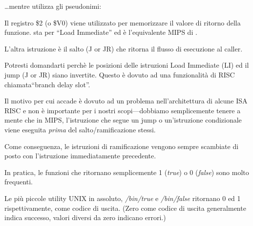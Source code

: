 

\dots mentre \IDA utilizza gli pseudonimi:



Il registro \$2 (o \$V0) viene utilizzato per memorizzare il valore di ritorno della funzione.
 sta per ``Load Immediate'' ed è l'equivalente MIPS di \MOV.

L'altra istruzione è il salto (J or JR) che ritorna il flusso di esecuzione al \gls{caller}.

Potresti domandarti perchè le posizioni delle istruzioni Load Immediate (LI) ed il jump (J or JR) siano invertite. Questo è dovuto ad una funzionalità di \ac{RISC} chiamata``branch delay slot''.

Il motivo per cui accade è dovuto ad un problema nell'architettura di alcune \ac{ISA} RISC e non è importante per i nostri
scopi---dobbiamo semplicemente tenere a mente che in MIPS, l'istruzione che segue un jump o un'istruzione condizionale
viene eseguita \emph{prima} del salto/ramificazione stessi.

Come conseguenza, le istruzioni di ramificazione vengono sempre scambiate di posto con l'istruzione immediatamente precedente.

In pratica, le funzioni che ritornano semplicemente 1 (\emph{true}) o 0 (\emph{false}) sono molto frequenti.

Le più piccole utility UNIX in assoluto, \emph{/bin/true} e \emph{/bin/false} ritornano 0 ed 1 rispettivamente, come codice di uscita.
(Zero come codice di uscita generalmente indica successo, valori diversi da zero indicano errori.)
